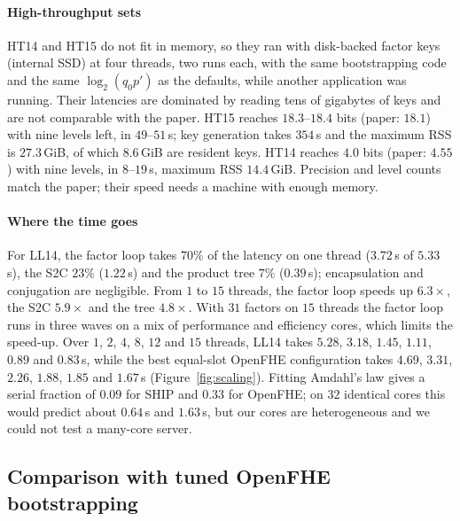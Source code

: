 \documentclass[sigconf,nonacm]{acmart}
\newcommand{\lgqp}{\log_2(q_0 p')}
\begin{document}
\paragraph{High-throughput sets}
HT14 and HT15 do not fit in memory, so they ran with disk-backed factor keys (internal SSD) at four threads, two runs each, with the same bootstrapping code and the same $\lgqp$ as the defaults, while another application was running.
Their latencies are dominated by reading tens of gigabytes of keys and are not comparable with the paper.
HT15 reaches $18.3$--$18.4$ bits (paper: $18.1$) with nine levels left, in $49$--$51$\,s; key generation takes $354$\,s and the maximum RSS is $27.3$\,GiB, of which $8.6$\,GiB are resident keys.
HT14 reaches $4.0$ bits (paper: $4.55$) with nine levels, in $8$--$19$\,s, maximum RSS $14.4$\,GiB.
Precision and level counts match the paper; their speed needs a machine with enough memory.

\paragraph{Where the time goes}
For LL14, the factor loop takes $70\%$ of the latency on one thread ($3.72$\,s of $5.33$\,s), the S2C $23\%$ ($1.22$\,s) and the product tree $7\%$ ($0.39$\,s); encapsulation and conjugation are negligible.
From $1$ to $15$ threads, the factor loop speeds up $6.3\times$, the S2C $5.9\times$ and the tree $4.8\times$.
With $31$ factors on $15$ threads the factor loop runs in three waves on a mix of performance and efficiency cores, which limits the speed-up.
Over $1$, $2$, $4$, $8$, $12$ and $15$ threads, LL14 takes $5.28$, $3.18$, $1.45$, $1.11$, $0.89$ and $0.83$\,s, while the best equal-slot OpenFHE configuration takes $4.69$, $3.31$, $2.26$, $1.88$, $1.85$ and $1.67$\,s (Figure~\ref{fig:scaling}).
Fitting Amdahl's law gives a serial fraction of $0.09$ for SHIP and $0.33$ for OpenFHE; on $32$ identical cores this would predict about $0.64$\,s and $1.63$\,s, but our cores are heterogeneous and we could not test a many-core server.

\subsection{Comparison with tuned OpenFHE bootstrapping}
\end{document}
